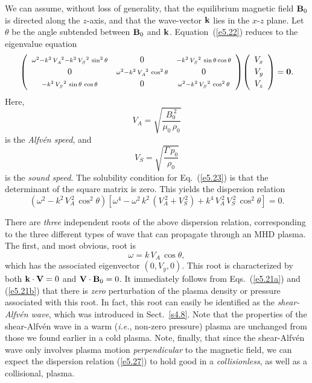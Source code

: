 We can assume, without loss of generality, that the equilibrium magnetic
field  ${\bf B}_0$ 
is directed along the $z$-axis, and that the wave-vector ${\bf k}$ lies
in the $x$-$z$ plane. Let $\theta$ be the angle subtended between ${\bf B}_0$ and
${\bf k}$. Equation~(\ref{e5.22}) reduces to the eigenvalue
equation
\begin{equation}
\left(
\begin{array}{ccc}
{\scriptstyle \omega^2 - k^2\,V_A^{~2} -k^2\,V_S^{~2}\,\sin^2\theta}&
0& {\scriptstyle -k^2\,V_S^{~2}\,\sin\theta
\cos\theta}\\[0.5ex]
0&{\scriptstyle \omega^2-k^2\,V_A^{~2}\,\cos^2\theta} & 0\\[0.5ex]
{\scriptstyle -k^2\,V_S^{~2}\,\sin\theta\,\cos\theta} &0& 
{\scriptstyle \omega^2-k^2\,V_S^{~2}\,\cos^2\theta}
\end{array}\right)\!\left(\begin{array}{c}V_x\\[0.5ex]
V_y\\[0.5ex] V_z\end{array}\right) = {\bf 0}.\label{e5.23}
\end{equation}
Here,
\begin{equation}\label{e5.24}
V_A = \sqrt{\frac{B_0^{~2}}{\mu_0\,\rho_0}}
\end{equation}
is the {\em Alfv\'{e}n speed}, and 
\begin{equation}\label{e5.25}
V_S = \sqrt{\frac{{\Gamma}\,p_0}{\rho_0}}
\end{equation}
is the {\em sound speed}. The solubility condition for Eq.~(\ref{e5.23}) is that
the determinant of the square matrix is zero. This yields the dispersion
relation
\begin{equation}\label{e5.26}
(\omega^2 - k^2\,V_A^{~2}\,\cos^2\theta)\left[
\omega^4 - \omega^2\,k^2\,(V_A^{~2}+V_S^{~2}) + k^4\,V_A^{~2}\,V_S^{~2}\,\cos^2\theta
\right] = 0.
\end{equation}

There are {\em three}\/ independent roots of the above dispersion relation, 
corresponding to the three different types of wave that can propagate through an
MHD plasma. The first, and most obvious, root is
\begin{equation}\label{e5.27}
\omega = k\,V_A\,\cos\theta,
\end{equation}
which has the associated eigenvector $(0,V_y, 0)$. This
root is characterized by both ${\bf k}\cdot{\bf V} =0$ and ${\bf V}\cdot
{\bf B}_0=0$. It immediately follows from Eqs.~(\ref{e5.21a}) and (\ref{e5.21b}) that there is
{\em zero}\/   perturbation of the plasma density or pressure
associated with this root. In fact, this root can easily be
identified as the {\em shear-Alfv\'{e}n wave}, which was
introduced in Sect.~\ref{s4.8}. Note
that the properties of the shear-Alfv\'{e}n wave in a warm ({\em i.e.}, non-zero
pressure) plasma are unchanged from  those we found earlier in a cold plasma. 
Note, finally, that since the shear-Alfv\'{e}n wave only involves plasma
motion {\em perpendicular}\/ to the magnetic field, we can expect the
dispersion relation (\ref{e5.27}) to hold good in a {\em collisionless}, as well as a
collisional, plasma. 

